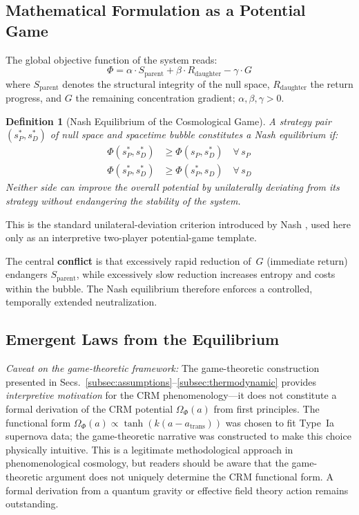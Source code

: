 \documentclass[aps,prd,twocolumn,superscriptaddress,nofootinbib]{revtex4-2}
\newtheorem{definition}{Definition}
\begin{document}
\subsection{Mathematical Formulation as a Potential Game}
\label{subsec:potentialgame}

The global objective function of the system reads:
\begin{equation}
\Phi = \alpha \cdot S_{\mathrm{parent}} + \beta \cdot R_{\mathrm{daughter}} - \gamma \cdot G
\label{eq:potential}
\end{equation}
where $S_{\mathrm{parent}}$ denotes the structural integrity of the null space, $R_{\mathrm{daughter}}$ the return progress, and $G$ the remaining concentration gradient; $\alpha, \beta, \gamma > 0$.

\begin{definition}[Nash Equilibrium of the Cosmological Game]
A strategy pair $(s_P^*, s_D^*)$ of null space and spacetime bubble constitutes a Nash equilibrium if:
\begin{align}
\Phi(s_P^*, s_D^*) &\geq \Phi(s_P, s_D^*) \quad \forall\, s_P \\
\Phi(s_P^*, s_D^*) &\geq \Phi(s_P^*, s_D) \quad \forall\, s_D
\end{align}
Neither side can improve the overall potential by unilaterally deviating from its strategy without endangering the stability of the system.
\end{definition}

This is the standard unilateral-deviation criterion introduced by Nash \cite{Nash1950}, used here only as an interpretive two-player potential-game template.

The central \textbf{conflict} is that excessively rapid reduction of~$G$ (immediate return) endangers $S_{\mathrm{parent}}$, while excessively slow reduction increases entropy and costs within the bubble. The Nash equilibrium therefore enforces a controlled, temporally extended neutralization.


\subsection{Emergent Laws from the Equilibrium}
\label{subsec:emergentlaws}

\textit{Caveat on the game-theoretic framework:} The game-theoretic construction presented in Secs.~\ref{subsec:assumptions}--\ref{subsec:thermodynamic} provides \emph{interpretive motivation} for the CRM phenomenology---it does not constitute a formal derivation of the CRM potential $\Omega_\Phi(a)$ from first principles. The functional form $\Omega_\Phi(a) \propto \tanh(k(a - a_\mathrm{trans}))$ was chosen to fit Type~Ia supernova data; the game-theoretic narrative was constructed to make this choice physically intuitive. This is a legitimate methodological approach in phenomenological cosmology, but readers should be aware that the game-theoretic argument does not uniquely determine the CRM functional form. A formal derivation from a quantum gravity or effective field theory action remains outstanding.
\end{document}
